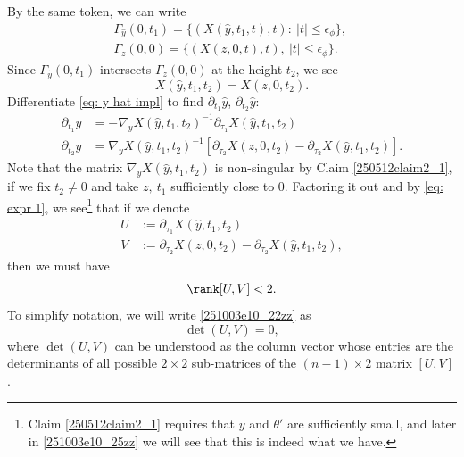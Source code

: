 \documentclass{article}
\numberwithin{equation}{section}
\theoremstyle{plain}
\begin{document}
By the same token, we can write
\begin{align}
    \Gamma_{\hat{y}}(0,t_1)=\{ (X(\hat{y},t_1,t),t):\ |t|\le \epsilon_{\phi}\},\\
    \Gamma_{z}(0,0)=\{ (X(z,0,t),t),\ |t|\le \epsilon_{\phi}\}.  \quad
\end{align}
Since $\Gamma_{\hat{y}}(0,t_1)$ intersects $\Gamma_{z}(0,0)$ at the height $t_2$, we see
\begin{equation}\label{eq: y hat impl}
    X(\hat{y},t_1,t_2)= X(z,0,t_2).
\end{equation}
 Differentiate \eqref{eq: y hat impl} to find $\partial_{t_1} \hat y$, $\partial_{t_2} \hat y$: 
    \begin{align}\label{250512e2_1516}
        \partial_{t_1} \hat y &= -\nabla_y X(\hat{y},t_1,t_2)^{-1} \partial_{\tau_1} X(\hat{y},t_1,t_2) \\
        \partial_{t_2} \hat y &= \nabla_y X(\hat{y},t_1,t_2)^{-1} [\partial_{\tau_2} X(z,0,t_2) - \partial_{\tau_2} X(\hat{y},t_1,t_2)].
    \end{align}
Note that the matrix $\nabla_y X(\hat{y},t_1,t_2)$ is non-singular by Claim \ref{250512claim2_1}, if we fix $t_2\neq 0$ and take $z,\ t_1$ sufficiently close to 0. Factoring it out and by \eqref{eq: expr 1}, we see\footnote{Claim \ref{250512claim2_1} requires that $y$ and $\theta'$ are sufficiently small, and later in \eqref{251003e10_25zz} we will see that this is indeed what we have. } that if we denote  
    \begin{align}
        U &:=\partial_{\tau_1} X(\hat y, t_1, t_2) \\
        V &:=\partial_{\tau_2} X(z, 0, t_2) - \partial_{\tau_2} X(\hat y, t_1, t_2),
    \end{align}
    then we must have 
    \begin{equation}\label{251003e10_22zz}
            \rank[U, V] < 2.
    \end{equation}
 To simplify notation, we will write \eqref{251003e10_22zz} as 
 \begin{equation}
 \det(U, V)=0,
 \end{equation}
 where 
 $\det(U, V)$ can be understood as the column vector whose entries are the determinants of all possible $2\times 2$ sub-matrices of the $(n-1)\times 2$ matrix $[U, V]$. \\
 
\end{document}
